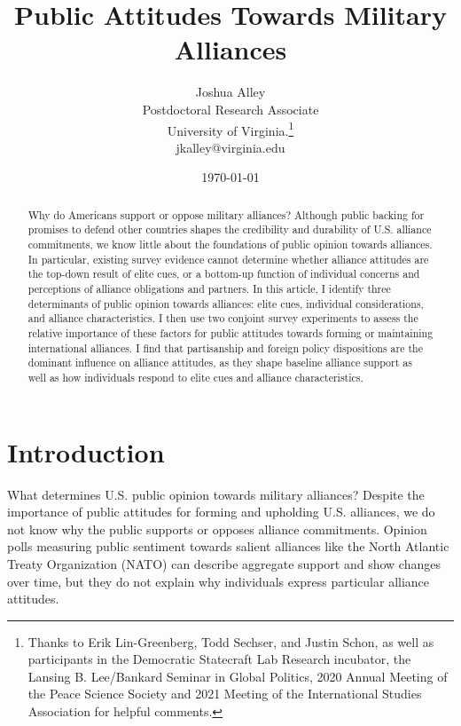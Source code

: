 \documentclass[12pt]{article}
\title{\textbf{Public Attitudes Towards Military Alliances}}
\author{Joshua Alley \\
Postdoctoral Research Associate \\
University of Virginia.\thanks{Thanks to Erik Lin-Greenberg, Todd Sechser, and Justin Schon, as well as participants in the Democratic Statecraft Lab Research incubator, the Lansing B. Lee/Bankard Seminar in Global Politics, 2020 Annual Meeting of the Peace Science Society and 2021 Meeting of the International Studies Association for helpful comments.} \\
jkalley@virginia.edu
}
\date{\today}
\begin{document}
\maketitle 

\doublespace 

\begin{abstract}
Why do Americans support or oppose military alliances? 
Although public backing for promises to defend other countries shapes the credibility and durability of U.S. alliance commitments, we know little about the foundations of public opinion towards alliances.
In particular, existing survey evidence cannot determine whether alliance attitudes are the top-down result of elite cues, or a bottom-up function of individual concerns and perceptions of alliance obligations and partners. 
In this article, I identify three determinants of public opinion towards alliances: elite cues, individual considerations, and alliance characteristics. 
I then use two conjoint survey experiments to assess the relative importance of these factors for public attitudes towards forming or maintaining international alliances.  
I find that partisanship and foreign policy dispositions are the dominant influence on alliance attitudes, as they shape baseline alliance support as well as how individuals respond to elite cues and alliance characteristics.  
\end{abstract}


\newpage 


\section{Introduction}

What determines U.S. public opinion towards military alliances? 
Despite the importance of public attitudes for forming and upholding U.S. alliances, we do not know why the public supports or opposes alliance commitments. 
Opinion polls measuring public sentiment towards salient alliances like the North Atlantic Treaty Organization (NATO) can describe aggregate support and show changes over time, but they do not explain why individuals express particular alliance attitudes. 
\end{document}
